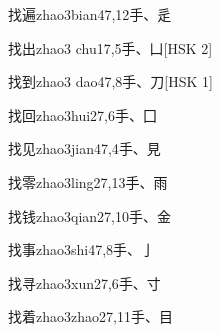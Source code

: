 \begin{EntryWithPhonetic}{找遍}{zhao3bian4}{7,12}{⼿、⾡}
\end{EntryWithPhonetic}

\begin{EntryWithPhonetic}{找出}{zhao3 chu1}{7,5}{⼿、⼐}[HSK 2]
\end{EntryWithPhonetic}

\begin{EntryWithPhonetic}{找到}{zhao3 dao4}{7,8}{⼿、⼑}[HSK 1]
\end{EntryWithPhonetic}

\begin{EntryWithPhonetic}{找回}{zhao3hui2}{7,6}{⼿、⼞}
\end{EntryWithPhonetic}

\begin{EntryWithPhonetic}{找见}{zhao3jian4}{7,4}{⼿、⾒}
\end{EntryWithPhonetic}

\begin{EntryWithPhonetic}{找零}{zhao3ling2}{7,13}{⼿、⾬}
\end{EntryWithPhonetic}

\begin{EntryWithPhonetic}{找钱}{zhao3qian2}{7,10}{⼿、⾦}
\end{EntryWithPhonetic}

\begin{EntryWithPhonetic}{找事}{zhao3shi4}{7,8}{⼿、⼅}
\end{EntryWithPhonetic}

\begin{EntryWithPhonetic}{找寻}{zhao3xun2}{7,6}{⼿、⼨}
\end{EntryWithPhonetic}

\begin{EntryWithPhonetic}{找着}{zhao3zhao2}{7,11}{⼿、⽬}
\end{EntryWithPhonetic}

